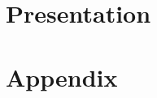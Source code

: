 \documentclass[a4paper,11pt,twoside,parskip=half,numbers=noenddot,bibliography=totocnumbered,listof = totoc]{scrbook}
\begin{document}

\frontmatter


%

\cleardoublepage
\dominitoc
\tableofcontents
\cleardoublepage
%
%
%

\mainmatter

\part{Presentation}


%
%
%
%

\footnotesize
{} %

\normalsize

\appendix
\part{Appendix}
%
%
%
%
%
%
%
%

\end{document}
